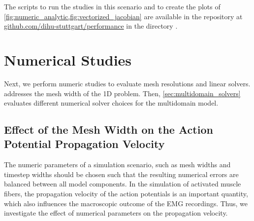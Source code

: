 \begin{reproduce_no_break}
  The scripts to run the studies in this scenario and to create the plots of \cref{fig:numeric_analytic,fig:vectorized_jacobian} are available in the repository at \href{https://github.com/dihu-stuttgart/performance}{github.com/dihu-stuttgart/performance}
  in the directory .
\end{reproduce_no_break}

\section{Numerical Studies}

Next, we perform numeric studies to evaluate mesh resolutions and linear solvers. 
 addresses the mesh width of the 1D problem. Then, \cref{sec:multidomain_solvers} evaluates different numerical solver choices for the multidomain model.

\iffalse
\subsection{Effect of the Mesh Width on the Action Potential Propagation Velocity}\label{sec:action_potential_velocity}

The numeric parameters of a simulation scenario, such as mesh widths and timestep widths should be chosen such that the resulting numerical errors are balanced between all model components. In the simulation of activated muscle fibers, the propagation velocity of the action potentials is an important quantity, which also influences the macroscopic outcome of the EMG recordings. Thus, we investigate the effect of numerical parameters on the propagation velocity.


